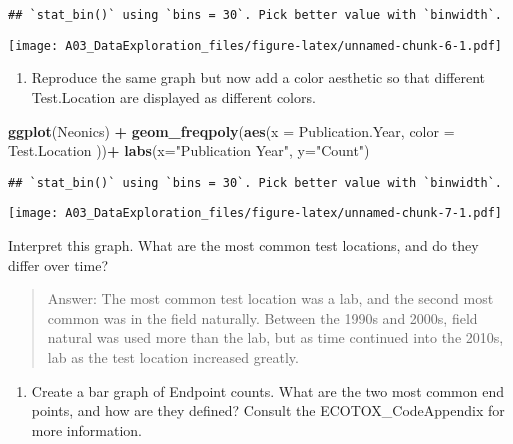 \documentclass[]{article}
\newenvironment{Shaded}{\begin{snugshade}}{\end{snugshade}}
\newcommand{\DataTypeTok}[1]{\textcolor[rgb]{0.13,0.29,0.53}{#1}}
\newcommand{\KeywordTok}[1]{\textcolor[rgb]{0.13,0.29,0.53}{\textbf{#1}}}
\newcommand{\NormalTok}[1]{#1}
\newcommand{\OperatorTok}[1]{\textcolor[rgb]{0.81,0.36,0.00}{\textbf{#1}}}
\newcommand{\StringTok}[1]{\textcolor[rgb]{0.31,0.60,0.02}{#1}}
\providecommand{\tightlist}{%
  \setlength{\itemsep}{0pt}\setlength{\parskip}{0pt}}
\begin{document}
\begin{verbatim}
## `stat_bin()` using `bins = 30`. Pick better value with `binwidth`.
\end{verbatim}

\texttt{[image: A03\_DataExploration\_files/figure-latex/unnamed-chunk-6-1.pdf]}

\begin{enumerate}
\def\labelenumi{\arabic{enumi}.}
\setcounter{enumi}{9}
\tightlist
\item
  Reproduce the same graph but now add a color aesthetic so that
  different Test.Location are displayed as different colors.
\end{enumerate}

\begin{Shaded}
\begin{Highlighting}[]
\KeywordTok{ggplot}\NormalTok{(Neonics) }\OperatorTok{+}
\StringTok{  }\KeywordTok{geom_freqpoly}\NormalTok{(}\KeywordTok{aes}\NormalTok{(}\DataTypeTok{x =}\NormalTok{ Publication.Year, }\DataTypeTok{color =}\NormalTok{ Test.Location ))}\OperatorTok{+}
\StringTok{  }\KeywordTok{labs}\NormalTok{(}\DataTypeTok{x=}\StringTok{"Publication Year"}\NormalTok{, }\DataTypeTok{y=}\StringTok{"Count"}\NormalTok{)}
\end{Highlighting}
\end{Shaded}

\begin{verbatim}
## `stat_bin()` using `bins = 30`. Pick better value with `binwidth`.
\end{verbatim}

\texttt{[image: A03\_DataExploration\_files/figure-latex/unnamed-chunk-7-1.pdf]}

Interpret this graph. What are the most common test locations, and do
they differ over time?

\begin{quote}
Answer: The most common test location was a lab, and the second most
common was in the field naturally. Between the 1990s and 2000s, field
natural was used more than the lab, but as time continued into the
2010s, lab as the test location increased greatly.
\end{quote}

\begin{enumerate}
\def\labelenumi{\arabic{enumi}.}
\setcounter{enumi}{10}
\tightlist
\item
  Create a bar graph of Endpoint counts. What are the two most common
  end points, and how are they defined? Consult the ECOTOX\_CodeAppendix
  for more information.
\end{enumerate}
\end{document}
